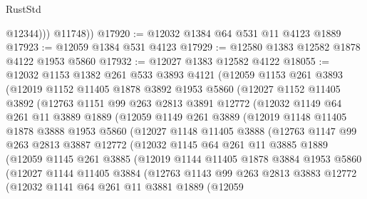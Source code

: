 \begin{lexlean}{RustStd}
\begin{coremodule}
{\begin{coremodule}
{{{{{{{{{{{{{{{{{{{{{{{{{{{{{              @12344)))
        @11748))
@17920 := @12032 @1384 @64 @531 @11 @4123 @1889
@17923 := @12059 @1384 @531 @4123
@17929 := @12580 @1383 @12582 @1878 @4122 @1953 @5860
@17932 := @12027 @1383 @12582 @4122
@18055 := @12032
    @1153
    @1382
    @261
    @533
    @3893
    @4121
    (@12059
      @1153
      @261
      @3893
      (@12019
        @1152
        @11405
        @1878
        @3892
        @1953
        @5860
        (@12027
          @1152
          @11405
          @3892
          (@12763
            @1151
            @99
            @263
            @2813
            @3891
            @12772
            (@12032
              @1149
              @64
              @261
              @11
              @3889
              @1889
              (@12059
                @1149
                @261
                @3889
                (@12019
                  @1148
                  @11405
                  @1878
                  @3888
                  @1953
                  @5860
                  (@12027
                    @1148
                    @11405
                    @3888
                    (@12763
                      @1147
                      @99
                      @263
                      @2813
                      @3887
                      @12772
                      (@12032
                        @1145
                        @64
                        @261
                        @11
                        @3885
                        @1889
                        (@12059
                          @1145
                          @261
                          @3885
                          (@12019
                            @1144
                            @11405
                            @1878
                            @3884
                            @1953
                            @5860
                            (@12027
                              @1144
                              @11405
                              @3884
                              (@12763
                                @1143
                                @99
                                @263
                                @2813
                                @3883
                                @12772
                                (@12032
                                  @1141
                                  @64
                                  @261
                                  @11
                                  @3881
                                  @1889
                                  (@12059
}}}}}}}}}}}}}}}}}}}}}}}}}}}}}
\end{coremodule}}
\end{coremodule}
\end{lexlean}
